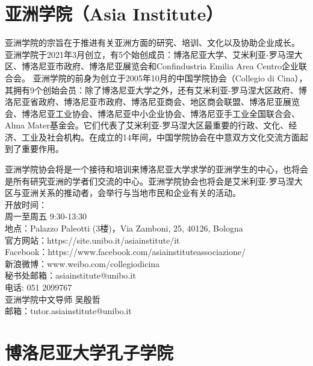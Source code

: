 \section{亚洲学院（Asia Institute）}

亚洲学院的宗旨在于推进有关亚洲方面的研究、培训、文化以及协助企业成长。
亚洲学院于2021年3月创立，有5个始创成员：博洛尼亚大学、艾米利亚-罗马涅大区、博洛尼亚市政府、博洛尼亚展览会和Confindustria Emilia Area Centro企业联合会。
亚洲学院的前身为创立于2005年10月的中国学院协会（Collegio di Cina），其拥有9个创始会员：除了博洛尼亚大学之外，还有艾米利亚-罗马涅大区政府、博洛尼亚省政府、博洛尼亚市政府、博洛尼亚商会、地区商会联盟、博洛尼亚展览会、博洛尼亚工业协会、博洛尼亚中小企业协会、博洛尼亚手工业全国联合会、Alma Mater基金会。它们代表了艾米利亚-罗马涅大区最重要的行政、文化、经济、工业及社会机构。在成立的14年间，中国学院协会在中意双方文化交流方面起到了重要作用。

亚洲学院协会将是一个接待和培训来博洛尼亚大学求学的亚洲学生的中心，也将会是所有研究亚洲的学者们交流的中心。亚洲学院协会也将会是艾米利亚-罗马涅大区与亚洲关系的推动者，会举行与当地市民和企业有关的活动。
\\
\noindent 
开放时间：\\
周一至周五  9:30-13:30\\
地点：Palazzo Paleotti (3楼)，Via Zamboni, 25, 40126, Bologna\\
官方网站：https://site.unibo.it/asiainstitute/it\\
Facebook：https://www.facebook.com/asiainstituteassociazione/\\
新浪微博：www.weibo.com/collegiodicina\\
秘书处邮箱：asiainstitute@unibo.it\\
电话: 051 2099767 \\
亚洲学院中文导师  吴殷哲\\
邮箱：tutor.asiainstitute@unibo.it\\
\section{博洛尼亚大学孔子学院}

